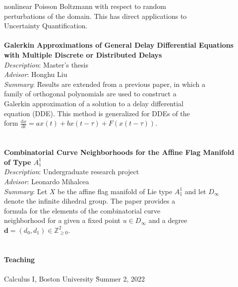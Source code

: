 \begin{center}
\begin{tabbing}
	\> \> \> nonlinear Poisson Boltzmann with respect to random \\
	\> \> \> perturbations of the domain. This has direct applications to \\
	\> \> \> Uncertainty Quantification. \\
	\> \\
	\> \textbf{{Galerkin Approximations of General Delay Differential Equations}} \\
	\> \textbf{{with Multiple Discrete or Distributed Delays}} \\
	\> \> \emph{Description}: Master's thesis \\
	\> \> \emph{Advisor}: Honghu Liu \\
	\> \> \emph{Summary}: \= Results are extended from a previous paper, in which a \\
	\> \> \> family of orthogonal polynomials are used to construct a  \\
	\> \> \> Galerkin approximation of a solution to a delay differential   \\
	\> \> \> equation (DDE). This method is generalized for DDEs of the  \\
	\> \> \> form \(\frac{\mathrm d x}{\mathrm d t} = ax(t) + bx(t-\tau) + F(x(t-\tau)).\) \\
	\\
	\> \\
	\> \textbf{{Combinatorial Curve Neighborhoods for the Affine Flag Manifold }}  \\
	\> \textbf{{of Type $A^1_1$}} \\
	\> \> \emph{Description}: Undergraduate research project\\
	\> \> \emph{Advisor}: Leonardo Mihalcea\\
	\> \> \emph{Summary}: \= Let \(X\) be the affine flag manifold of Lie type \(A^1_1\) and let \(D_\infty\)  \\ 
	\> \> \> denote the infinite dihedral group. The paper provides a  \\
	\> \> \> formula for the elements of the combinatorial curve  \\
	\> \> \> neighborhood for a given a fixed point \(u\in D_\infty\) and a degree \\
	\> \> \> \(\mathbf d = (d_0,d_1)\in \mathbb Z^2_{\geq 0}\).
	\\
	\\ \\
	\textbf{\large{Teaching}} \\
	\\
	\> Calculus I, Boston University  \` Summer 2, 2022 \\

\end{tabbing}
\end{center}
